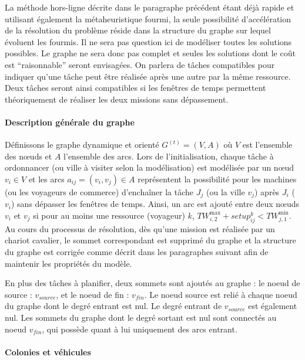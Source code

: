 La méthode hors-ligne décrite dans le paragraphe précédent étant déjà rapide et utilisant également la métaheuristique fourmi, la seule possibilité d'accélération de la résolution du problème réside dans la structure du graphe sur lequel évoluent les fourmis. 
Il ne sera pas question ici de modéliser toutes les solutions possibles. Le graphe ne sera donc pas complet et seules les solutions dont le coût est ``raisonnable'' seront envisagées. On parlera de tâches compatibles pour indiquer qu'une tâche peut être réalisée après une autre par la même ressource. Deux tâches seront ainsi compatibles si les fenêtres de temps permettent théoriquement de réaliser les deux missions sans dépassement. %

\paragraph{Description générale du graphe}

Définissons le graphe dynamique et orienté $G^{(t)}=(V,A)$ où $V$ est l'ensemble des n\oe{}uds et $A$ l'ensemble des arcs. Lors de l'initialisation, chaque tâche à ordonnancer (ou ville à visiter selon la modélisation) est modélisée par un n\oe{}ud $v_i \in V$ et les arcs $a_{ij} = (v_i,v_j) \in A$ représentent la possibilité pour les machines (ou les voyageurs de commerce) d'enchaîner la tâche $J_j$ (ou la ville $v_j$) après $J_i$ ($v_i$) sans dépasser les fenêtres de temps. Ainsi, un arc est ajouté entre deux n\oe{}uds $v_i$ et $v_j$ si pour au moins une ressource (voyageur) $k$, $TW_{i,2}^{\max} + setup^{k}_{ij} < TW_{j,1}^{\min}$. Au cours du processus de résolution, dès qu'une mission est réalisée par un chariot cavalier, le sommet correspondant est supprimé du graphe et la structure du graphe est corrigée comme décrit dans les paragraphes suivant afin de maintenir les propriétés du modèle.

En plus des tâches à planifier, deux sommets sont ajoutés au graphe : le noeud de source : $v_{source}$, et le noeud de fin : $v_{fin}$. Le noeud source est relié à chaque noeud du graphe dont le degré entrant est nul. Le degré entrant de $v_{source}$ est également nul. Les sommets du graphe dont le degré sortant est nul sont connectés au noeud $v_{fin}$, qui possède quant à lui uniquement des arcs entrant.

\paragraph{Colonies et véhicules}

